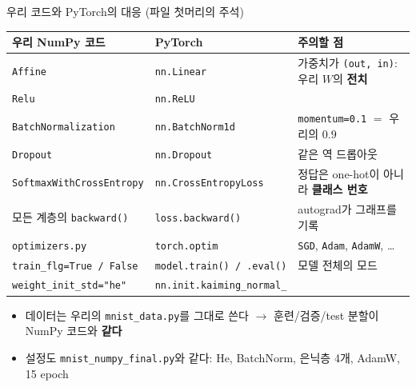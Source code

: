 \documentclass[aspectratio=169,11pt]{beamer}
\newcommand{\code}[1]{\texttt{#1}}
\begin{document}
\begin{frame}{우리 코드와 PyTorch의 대응 (파일 첫머리의 주석)}
\footnotesize
\centering
\small
\footnotesize
\renewcommand{\arraystretch}{1.05}
\begin{tabular}{>{\raggedright}p{4.0cm}>{\raggedright}p{4.0cm}>{\raggedright\arraybackslash}p{4.4cm}}
\toprule
\textbf{우리 NumPy 코드} & \textbf{PyTorch} & \textbf{주의할 점} \\
\midrule
\code{Affine} & \code{nn.Linear} & 가중치가 \code{(out, in)}: 우리 $W$의 \textbf{전치} \\
\code{Relu} & \code{nn.ReLU} & \\
\code{BatchNormalization} & \code{nn.BatchNorm1d} & \code{momentum=0.1} $=$ 우리의 $0.9$ \\
\code{Dropout} & \code{nn.Dropout} & 같은 역 드롭아웃 \\
\code{SoftmaxWithCrossEntropy} & \code{nn.CrossEntropyLoss} & 정답은 one-hot이 아니라 \textbf{클래스 번호} \\
모든 계층의 \code{backward()} & \code{loss.backward()} & autograd가 그래프를 기록 \\
\code{optimizers.py} & \code{torch.optim} & \code{SGD}, \code{Adam}, \code{AdamW}, \ldots \\
\code{train\_flg=True / False} & \code{model.train() / .eval()} & 모델 전체의 모드 \\
\code{weight\_init\_std="he"} & \code{nn.init.kaiming\_normal\_} & \\
\bottomrule
\end{tabular}
\raggedright
\begin{itemize}
\item 데이터는 우리의 \code{mnist\_data.py}를 그대로 쓴다 $\to$ 훈련/검증/test 분할이 NumPy 코드와 \textbf{같다}
\item 설정도 \code{mnist\_numpy\_final.py}와 같다: He, BatchNorm, 은닉층 4개, AdamW, 15 epoch
\end{itemize}
\end{frame}
\end{document}
